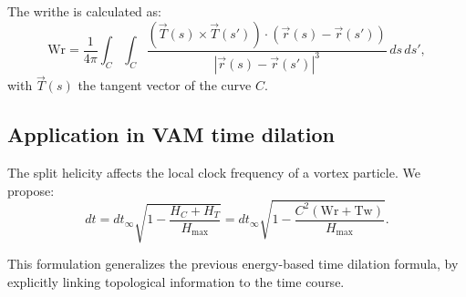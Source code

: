 The writhe is calculated as:
\begin{equation}
    \text{Wr} = \frac{1}{4\pi} \int_C \int_C \frac{\left(\vec{T}(s) \times \vec{T}(s')\right) \cdot \left(\vec{r}(s) - \vec{r}(s')\right)}{|\vec{r}(s) - \vec{r}(s')|^3} \, ds \, ds',
\end{equation}
with $\vec{T}(s)$ the tangent vector of the curve $C$.

\subsection{Application in VAM time dilation}

The split helicity affects the local clock frequency of a vortex particle. We propose:
\begin{equation}
    dt = dt_\infty \sqrt{1 - \frac{H_C + H_T}{H_\text{max}}} = dt_\infty \sqrt{1 - \frac{C^2 (\text{Wr} + \text{Tw})}{H_\text{max}}}.
\end{equation}

This formulation generalizes the previous energy-based time dilation formula, by explicitly linking topological information to the time course.